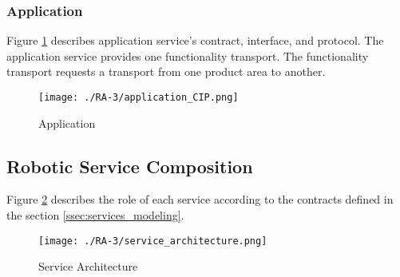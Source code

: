 \subsubsection{Application} %
Figure \ref{fig:application_cip} describes application service's contract, interface, and protocol. The application service provides one functionality transport. The functionality transport requests a transport from one product area to another. 
\begin{figure}[ht!]
 \centering
 \texttt{[image: ./RA-3/application\_CIP.png]}
 \caption{Application}
 \label{fig:application_cip}
\end{figure}

\subsection{Robotic Service Composition}
Figure \ref{fig:service_achitecture} describes the role of each service according to the contracts defined in the section \ref{ssec:services_modeling}.
\begin{figure}[ht!]
 \centering
 \texttt{[image: ./RA-3/service\_architecture.png]}
 \caption{Service Architecture}
 \label{fig:service_achitecture}
\end{figure}